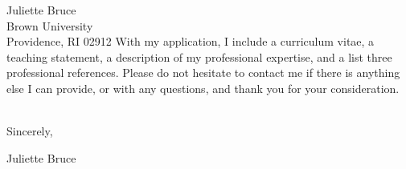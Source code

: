 \documentclass[11pt]{brownletter}
\begin{document}
\begin{letter}{Juliette Bruce\\ 
               Brown University\\ 
               Providence, RI 02912}
With my application, I include a curriculum vitae, a teaching statement, a description of my professional expertise, and a list three professional references. Please do not hesitate to contact me if there is anything else I can provide, or with any questions, and thank you for your consideration. 

\vspace{.1 in}
\\
Sincerely,
\\ \vspace{.1 in}

Juliette Bruce




\end{letter}
\end{document}
